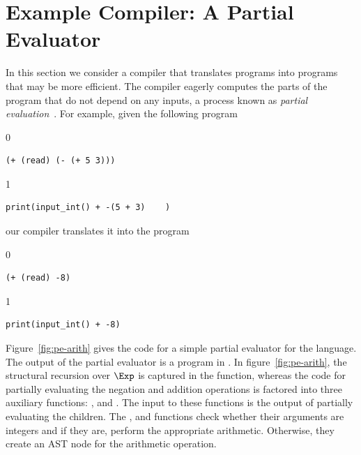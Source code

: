 \documentclass[7x10]{TimesAPriori_MIT}%
\def\racketEd{0}
\def\pythonEd{1}
\def\edition{0}
\numberwithin{theorem}{chapter}
\numberwithin{definition}{chapter}
\numberwithin{equation}{chapter}
\begin{document}
\section{Example Compiler: A Partial Evaluator}
\label{sec:partial-evaluation}

In this section we consider a compiler that translates \LangInt{}
programs into \LangInt{} programs that may be more efficient. The
compiler eagerly computes the parts of the program that do not depend
on any inputs, a process known as \emph{partial
evaluation}~\citep{Jones:1993uq}.  
For example, given the following program
{\if\edition\racketEd
\begin{lstlisting}
(+ (read) (- (+ 5 3)))
\end{lstlisting}
\fi}
{\if\edition\pythonEd
\begin{lstlisting}
print(input_int() + -(5 + 3)    )
\end{lstlisting}
\fi}
\noindent our compiler translates it into the program
{\if\edition\racketEd
\begin{lstlisting}
(+ (read) -8)
\end{lstlisting}
\fi}
{\if\edition\pythonEd
\begin{lstlisting}
print(input_int() + -8)
\end{lstlisting}
\fi}

Figure~\ref{fig:pe-arith} gives the code for a simple partial
evaluator for the \LangInt{} language. The output of the partial evaluator
is a program in \LangInt{}. In figure~\ref{fig:pe-arith}, the structural
recursion over $\Exp$ is captured in the  function,
whereas the code for partially evaluating the negation and addition
operations is factored into three auxiliary functions:
,  and . The input to these 
functions is the output of partially evaluating the children.
The ,  and  functions check whether their
arguments are integers and if they are, perform the appropriate
arithmetic. Otherwise, they create an AST node for the arithmetic
operation.
\end{document}

